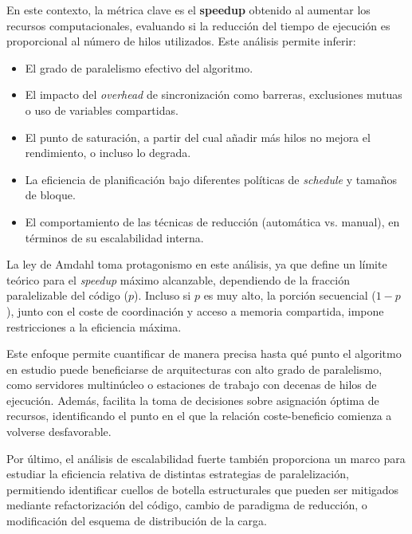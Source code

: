             En este contexto, la métrica clave es el \textbf{speedup} obtenido al aumentar los recursos computacionales, evaluando si la reducción del tiempo de ejecución es proporcional al número de hilos utilizados. Este análisis permite inferir:
            
            \begin{itemize}
            
                \item El grado de paralelismo efectivo del algoritmo.
                
                \item El impacto del \textit{overhead} de sincronización como barreras, exclusiones mutuas o uso de variables compartidas.
                
                \item El punto de saturación, a partir del cual añadir más hilos no mejora el rendimiento, o incluso lo degrada.
                
                \item La eficiencia de planificación bajo diferentes políticas de \textit{schedule} y tamaños de bloque.
                
                \item El comportamiento de las técnicas de reducción (automática vs. manual), en términos de su escalabilidad interna.
                
            \end{itemize}
            
            La ley de Amdahl toma protagonismo en este análisis, ya que define un límite teórico para el \textit{speedup} máximo alcanzable, dependiendo de la fracción paralelizable del código ($p$). Incluso si $p$ es muy alto, la porción secuencial ($1 - p$), junto con el coste de coordinación y acceso a memoria compartida, impone restricciones a la eficiencia máxima.
                        
            Este enfoque permite cuantificar de manera precisa hasta qué punto el algoritmo en estudio puede beneficiarse de arquitecturas con alto grado de paralelismo, como servidores multinúcleo o estaciones de trabajo con decenas de hilos de ejecución. Además, facilita la toma de decisiones sobre asignación óptima de recursos, identificando el punto en el que la relación coste-beneficio comienza a volverse desfavorable.
            
            Por último, el análisis de escalabilidad fuerte también proporciona un marco para estudiar la eficiencia relativa de distintas estrategias de paralelización, permitiendo identificar cuellos de botella estructurales que pueden ser mitigados mediante refactorización del código, cambio de paradigma de reducción, o modificación del esquema de distribución de la carga.        
\newpage


